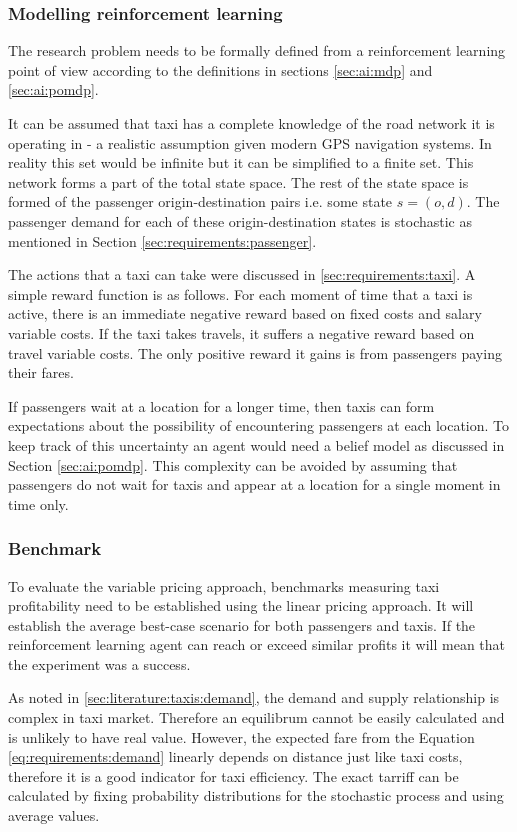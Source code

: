 \subsubsection{Modelling reinforcement learning}
\label{sec:requirements:ai}

The research problem needs to be formally defined from a reinforcement learning
point of view according to the definitions in sections \ref{sec:ai:mdp} and
\ref{sec:ai:pomdp}.

It can be assumed that taxi has a complete knowledge of the road network it is
operating in - a realistic assumption given modern GPS navigation systems. In
reality this set would be infinite but it can be simplified to a finite set.
This network forms a part of the total state space. The rest of the state space
is formed of the passenger origin-destination pairs i.e. some state \(s = (o,
d) \). The passenger demand for each of these origin-destination states is
stochastic as mentioned in Section \ref{sec:requirements:passenger}. 

The actions that a taxi can take were discussed in \ref{sec:requirements:taxi}.
A simple reward function is as follows. For each moment of time that a taxi is
active, there is an immediate negative reward based on fixed costs and salary
variable costs. If the taxi takes travels, it suffers a negative reward based
on travel variable costs. The only positive reward it gains is from passengers
paying their fares.

If passengers wait at a location for a longer time, then taxis can form
expectations about the possibility of encountering passengers at each location.
To keep track of this uncertainty an agent would need a belief model as
discussed in Section \ref{sec:ai:pomdp}. This complexity can be avoided by
assuming that passengers do not wait for taxis and appear at a location for a
single moment in time only.

\subsubsection{Benchmark} 

To evaluate the variable pricing approach, benchmarks measuring taxi
profitability need to be established using the linear pricing approach. It will
establish the average best-case scenario for both passengers and taxis. If the
reinforcement learning agent can reach or exceed similar profits it will mean
that the experiment was a success.

As noted in \ref{sec:literature:taxis:demand}, the demand and supply
relationship is complex in taxi market. Therefore an equilibrum cannot be
easily calculated and is unlikely to have real value. However, the expected
fare from the Equation \ref{eq:requirements:demand} linearly depends on
distance just like taxi costs, therefore it is a good indicator for taxi
efficiency. The exact tarriff can be calculated by fixing probability
distributions for the stochastic process and using average values.

